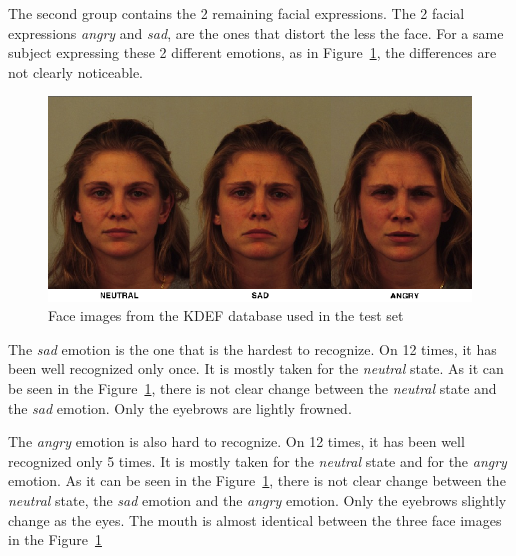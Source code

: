 \noindent The second group contains the 2 remaining facial expressions. The 2 facial expressions \textit{angry} and \textit{sad}, are the ones that distort the less the face. For a same subject expressing these 2 different emotions, as in Figure~\ref{kdef_no_difference_emotions}, the differences are not clearly noticeable.
\newline

\begin{figure}[!h]
\begin{center}
\noindent \includegraphics[scale=0.3]{figures/kdef_no_difference_emotions} 
\newline
\caption{Face images from the KDEF database used in the test set}
\label{kdef_no_difference_emotions}
\end{center} 
\end{figure}

\noindent The \textit{sad} emotion is the one that is the hardest to recognize. On 12 times, it has been well recognized only once. It is mostly taken for the \textit{neutral} state. As it can be seen in the Figure~\ref{kdef_no_difference_emotions}, there is not clear change between the \textit{neutral} state and the \textit{sad} emotion. Only the eyebrows are lightly frowned.
\newline

\noindent The \textit{angry} emotion is also hard to recognize. On 12 times, it has been well recognized only 5 times. It is mostly taken for the \textit{neutral} state and for the \textit{angry} emotion. As it can be seen in the Figure~\ref{kdef_no_difference_emotions}, there is not clear change between the \textit{neutral} state, the \textit{sad} emotion and the \textit{angry} emotion. Only the eyebrows slightly change as the eyes. The mouth is almost identical between the three face images in the Figure~\ref{kdef_no_difference_emotions}
\newline

